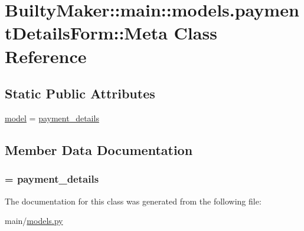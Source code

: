 \hypertarget{classBuiltyMaker_1_1main_1_1models_1_1paymentDetailsForm_1_1Meta}{\section{\-Builty\-Maker\-:\-:main\-:\-:models.\-payment\-Details\-Form\-:\-:\-Meta \-Class \-Reference}
\label{classBuiltyMaker_1_1main_1_1models_1_1paymentDetailsForm_1_1Meta}
}
\subsection*{\-Static \-Public \-Attributes}
\begin{DoxyCompactItemize}
\item 
\hyperlink{classBuiltyMaker_1_1main_1_1models_1_1paymentDetailsForm_1_1Meta_a33402c33c488e7b4cbbdb896e1786e6c}{model} = \hyperlink{classBuiltyMaker_1_1main_1_1models_1_1payment__details}{payment\-\_\-details}
\end{DoxyCompactItemize}


\subsection{\-Member \-Data \-Documentation}
\hypertarget{classBuiltyMaker_1_1main_1_1models_1_1paymentDetailsForm_1_1Meta_a33402c33c488e7b4cbbdb896e1786e6c}{
\subsubsection[{model}]{ = {\bf payment\-\_\-details}}}\label{classBuiltyMaker_1_1main_1_1models_1_1paymentDetailsForm_1_1Meta_a33402c33c488e7b4cbbdb896e1786e6c}


\-The documentation for this class was generated from the following file\-:\begin{DoxyCompactItemize}
\item 
main/\hyperlink{models_8py}{models.\-py}\end{DoxyCompactItemize}
